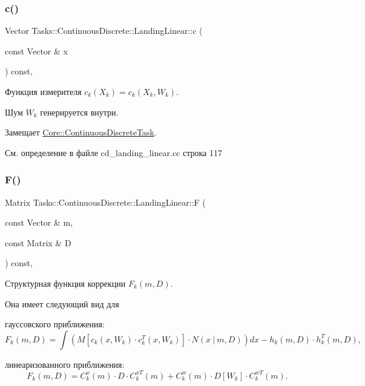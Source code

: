 \subsubsection{\texorpdfstring{c()}{c()}}
{\footnotesize\ttfamily Vector Tasks\+::\+Continuous\+Discrete\+::\+Landing\+Linear\+::c (\begin{DoxyParamCaption}\item[{const Vector \&}]{x }\end{DoxyParamCaption}) const\hspace{0.3cm}{\ttfamily [override]}, {\ttfamily [virtual]}}



Функция измерителя $c_k(X_k) = c_k(X_k, W_k)$. 

Шум $W_k$ генерируется внутри. 

Замещает \hyperlink{class_core_1_1_continuous_discrete_task_a64ea27bc1e2a9e6bf1401fc7622c9aea}{Core\+::\+Continuous\+Discrete\+Task}.



См. определение в файле cd\+\_\+landing\+\_\+linear.\+cc строка 117

\hypertarget{class_tasks_1_1_continuous_discrete_1_1_landing_linear_a5b5a327866160bf687dbc6d82a801ce8}{}\label{class_tasks_1_1_continuous_discrete_1_1_landing_linear_a5b5a327866160bf687dbc6d82a801ce8} 
\subsubsection{\texorpdfstring{F()}{F()}}
{\footnotesize\ttfamily Matrix Tasks\+::\+Continuous\+Discrete\+::\+Landing\+Linear\+::F (\begin{DoxyParamCaption}\item[{const Vector \&}]{m,  }\item[{const Matrix \&}]{D }\end{DoxyParamCaption}) const\hspace{0.3cm}{\ttfamily [override]}, {\ttfamily [virtual]}}



Структурная функция коррекции $F_k(m, D)$. 

Она имеет следующий вид для


\begin{DoxyItemize}
\item гауссовского приближения\+: \[F_k(m, D) = \int (M[c_k(x,W_k)\cdot c_k^T(x, W_k)] \cdot N(x\ |\ m,D))dx - h_k(m,D)\cdot h_k^T(m,D),\]
\item линеаризованного приближения\+: \[F_k(m, D) = C_k^x(m)\cdot D\cdot C_k^{xT}(m) + C_k^w(m)\cdot D[W_k]\cdot C_k^{wT}(m).\]
\end{DoxyItemize}

